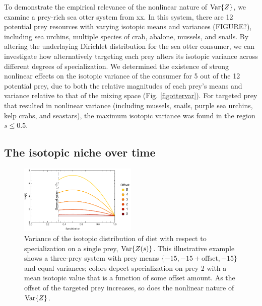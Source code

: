 \documentclass{frontiersSCNS}
\begin{document}
To demonstrate the empirical relevance of the nonlinear nature of ${\rm Var}\{Z\}$, we examine a prey-rich sea otter system from xx.
In this system, there are 12 potential prey resources with varying isotopic means and variances (FIGURE?), including sea urchins, multiple species of crab, abalone, mussels, and snails.
By altering the underlaying Dirichlet distribution for the sea otter consumer, we can investigate how alternatively targeting each prey alters its isotopic variance across different degrees of specialization.
We determined the existence of strong nonlinear effects on the isotopic variance of the consumer for 5 out of the 12 potential prey, due to both the relative magnitudes of each prey's means and variance relative to that of the mixing space (Fig. \ref{figottervar}).
For targeted prey that resulted in nonlinear variance (including mussels, snails, purple sea urchins, kelp crabs, and seastars), the maximum isotopic variance was found in the region $s \leq 0.5$.



\subsection{The isotopic niche over time}














\begin{figure}[h!]
\centering
\includegraphics[width=0.5\textwidth]{fig_var.pdf}
\caption{
Variance of the isotopic distribution of diet with respect to specialization on a single prey, ${\rm Var}\{Z(s)\}$.
This illustrative example shows a three-prey system with prey means $\{-15,-15+\mbox{offset},-15\}$ and equal variances; colors depect specialization on prey 2 with a mean isotopic value that is a function of some offset amount.
As the offset of the targeted prey increases, so does the nonlinear nature of ${\rm Var}\{Z\}$.
}
  \label{figvar}
\end{figure}
\end{document}
